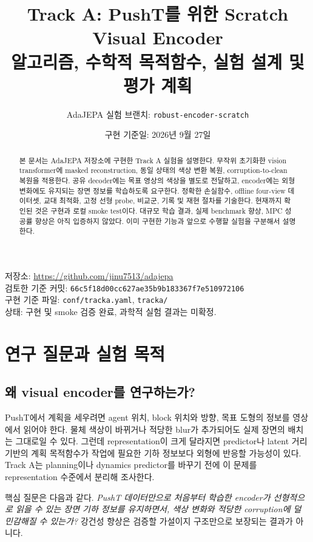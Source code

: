 \documentclass[11pt,a4paper]{article}
\title{\textcolor{accent}{Track A: PushT를 위한 Scratch Visual Encoder}\\[5pt]
\large 알고리즘, 수학적 목적함수, 실험 설계 및 평가 계획}
\author{AdaJEPA 실험 브랜치: \texttt{robust-encoder-scratch}}
\date{구현 기준일: 2026년 9월 27일}
\newcommand{\code}[1]{\nolinkurl{#1}}
\begin{document}
\renewcommand{\abstractname}{초록}
\renewcommand{\contentsname}{목차}
\renewcommand{\refname}{참고문헌}
\renewcommand{\figurename}{그림}
\renewcommand{\tablename}{표}
\maketitle
\begin{abstract}
본 문서는 AdaJEPA 저장소에 구현한 Track A 실험을 설명한다. 무작위 초기화한
vision transformer에 masked reconstruction, 동일 상태의 색상 변환 복원,
corruption-to-clean 복원을 적용한다. 공유 decoder에는 목표 영상의 색상을
별도로 전달하고, encoder에는 외형 변화에도 유지되는 장면 정보를 학습하도록
요구한다. 정확한 손실함수, offline four-view 데이터셋, 교대 최적화,
고정 선형 probe, 비교군, 기록 및 재현 절차를 기술한다.
현재까지 확인된 것은 구현과 로컬 smoke test이다. 대규모 학습 결과,
실제 benchmark 향상, MPC 성공률 향상은 아직 입증하지 않았다.
이미 구현한 기능과 앞으로 수행할 실험을 구분해서 설명한다.
\end{abstract}

\begin{center}\small
저장소: \url{https://github.com/jinu7513/adajepa}\\
검토한 기준 커밋: \code{66c5f18d00cc627ae35b9b183367f7e510972106}\\
구현 기준 파일: \code{conf/tracka.yaml}, \code{tracka/}\\
상태: 구현 및 smoke 검증 완료, 과학적 실험 결과는 미확정.
\end{center}
\tableofcontents
\newpage

\section{연구 질문과 실험 목적}
\subsection{왜 visual encoder를 연구하는가?}
PushT에서 계획을 세우려면 agent 위치, block 위치와 방향, 목표 도형의 정보를
영상에서 읽어야 한다. 물체 색상이 바뀌거나 적당한 blur가 추가되어도 실제 장면의
배치는 그대로일 수 있다. 그런데 representation이 크게 달라지면 predictor나
latent 거리 기반의 계획 목적함수가 작업에 필요한 기하 정보보다 외형에 반응할
가능성이 있다. Track A는 planning이나 dynamics predictor를 바꾸기 전에 이
문제를 representation 수준에서 분리해 조사한다.

핵심 질문은 다음과 같다. \emph{PushT 데이터만으로 처음부터 학습한 encoder가
선형적으로 읽을 수 있는 장면 기하 정보를 유지하면서, 색상 변화와 적당한
corruption에 덜 민감해질 수 있는가?} 강건성 향상은 검증할 가설이지 구조만으로
보장되는 결과가 아니다.
\end{document}
